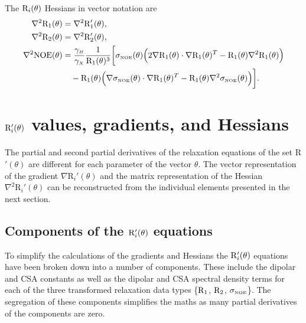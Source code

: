 The $\mathrm{R}_i(\theta)$ Hessians in vector notation are
\begin{subequations}
\begin{align}
    \nabla^2 \mathrm{R}_1(\theta) & = \nabla^2 \mathrm{R}_1'(\theta), \label{eq: Ri trans: d2R1} \\
    \nabla^2 \mathrm{R}_2(\theta) & = \nabla^2 \mathrm{R}_2'(\theta), \label{eq: Ri trans: d2R2} \\
    \nabla^2 \mathrm{NOE}(\theta) & = \frac{\gamma_{\scriptscriptstyle H}}{\gamma_{\scriptscriptstyle X}} \frac{1}{\mathrm{R}_1(\theta)^3} \bigg[
        \sigma_{\scriptscriptstyle \mathrm{NOE}}(\theta) \Big( 2 \nabla \mathrm{R}_1(\theta) \cdot \nabla \mathrm{R}_1(\theta)^T - \mathrm{R}_1(\theta) \nabla^2 \mathrm{R}_1(\theta) \Big) \nonumber\\
        & \quad - \mathrm{R}_1(\theta) \Big( \nabla \sigma_{\scriptscriptstyle \mathrm{NOE}}(\theta) \cdot \nabla \mathrm{R}_1(\theta)^T - \mathrm{R}_1(\theta) \nabla^2 \sigma_{\scriptscriptstyle \mathrm{NOE}}(\theta) \Big)
    \bigg]. \label{eq: Ri trans: d2NOE}
\end{align}
\end{subequations}




\newpage
\section{$\mathrm{R}_i'(\theta)$ values, gradients, and Hessians}

The partial and second partial derivatives of the relaxation equations of the set R$'(\theta)$ are different for each parameter of the vector $\theta$.  The vector representation of the gradient $\nabla \textrm{R}_i'(\theta)$ and the matrix representation of the Hessian $\nabla^2 \textrm{R}_i'(\theta)$ can be reconstructed from the individual elements presented in the next section.



\subsection{Components of the $\mathrm{R}_i'(\theta)$ equations}

To simplify the calculations of the gradients and Hessians the $\mathrm{R}_i'(\theta)$ equations have been broken down into a number of components.  These include the dipolar and CSA constants as well as the dipolar and CSA spectral density terms for each of the three transformed relaxation data types \{$\mathrm{R}_1$, $\mathrm{R}_2$, $\sigma_{\scriptscriptstyle \mathrm{NOE}}$\}.  The segregation of these components simplifies the maths as many partial derivatives of the components are zero.


